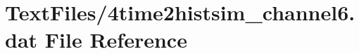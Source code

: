 \hypertarget{4time2histsim__channel6_8dat}{}\section{Text\+Files/4time2histsim\+\_\+channel6.dat File Reference}
\label{4time2histsim__channel6_8dat}
